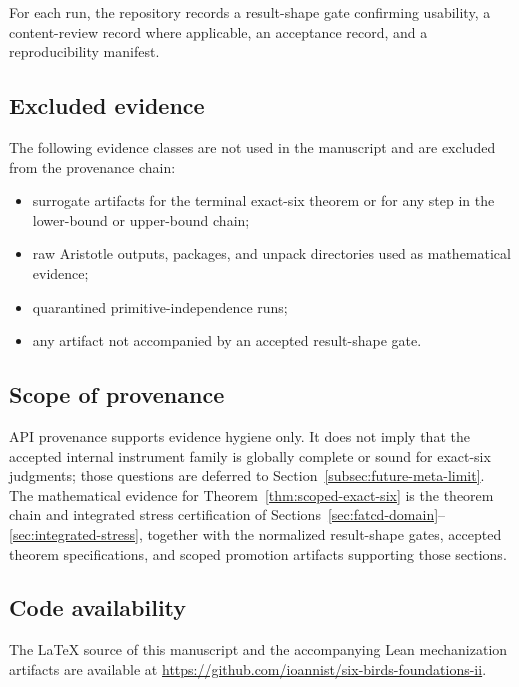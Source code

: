 For each run, the repository records a result-shape gate confirming
usability, a content-review record where applicable, an acceptance
record, and a reproducibility manifest.

\subsection{Excluded evidence}\label{app:excluded-evidence}

The following evidence classes are not used in the manuscript and are
excluded from the provenance chain:
\begin{itemize}[topsep=2pt,itemsep=1pt]
  \item surrogate artifacts for the terminal exact-six theorem or for
    any step in the lower-bound or upper-bound chain;
  \item raw Aristotle outputs, packages, and unpack directories used
    as mathematical evidence;
  \item quarantined primitive-independence runs;
  \item any artifact not accompanied by an accepted result-shape
    gate.
\end{itemize}

\subsection{Scope of provenance}\label{app:scope-of-provenance}

API provenance supports evidence hygiene only. It does not imply that
the accepted internal instrument family is globally complete or sound
for exact-six judgments; those questions are deferred to
Section~\ref{subsec:future-meta-limit}. The mathematical evidence for
Theorem~\ref{thm:scoped-exact-six} is the theorem chain and
integrated stress certification of
Sections~\ref{sec:fatcd-domain}--\ref{sec:integrated-stress},
together with the normalized result-shape gates, accepted theorem
specifications, and scoped promotion artifacts supporting those
sections.

\subsection{Code availability}\label{app:code-availability}

The \LaTeX{} source of this manuscript and the accompanying Lean
mechanization artifacts are available at
\url{https://github.com/ioannist/six-birds-foundations-ii}.
